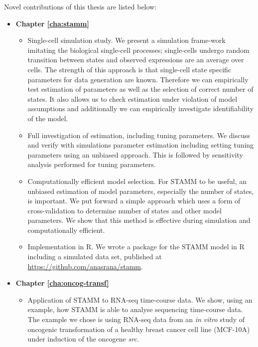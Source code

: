 \vspace*{2cm}
\noindent Novel contributions of this thesis are listed below:
\begin{itemize}
\item {\bf Chapter \ref{cha:stamm}}
\begin{itemize}
\item Single-cell simulation study. We present a simulation frame-work imitating the biological single-cell processes; single-cells undergo random transition between states and observed expressions are an average over cells. The strength of this approach is that single-cell state specific parameters for data generation are known. Therefore we can empirically test estimation of parameters as well as the selection of correct number of states. It also allows us to check estimation under violation of model assumptions and additionally we can empirically investigate identifiability of the model.

\item Full investigation of estimation, including tuning parameters. We discuss and verify with simulations parameter estimation including setting tuning parameters using an unbiased approach. This is followed by sensitivity analysis performed for tuning parameters.

\item Computationally efficient model selection. For STAMM to be useful, an unbiased estimation of model parameters, especially the number of states, is important. We put forward a simple approach which uses a form of cross-validation to determine number of states and other model parameters. We show that this method is effective during simulation and computationally efficient.

\item Implementation in R. We wrote a package for the STAMM model in R including a simulated data set, published at \url{https://github.com/anasrana/stamm}.

\end{itemize}

\item {\bf Chapter \ref{cha:oncog-transf}}

\begin{itemize}
\item Application of STAMM to RNA-seq time-course data.
We show, using an example, how STAMM is able to analyse sequencing time-course data. The example we chose is using RNA-seq data from an {\it in vitro} study of oncogenic transformation of a healthy breast cancer cell line (MCF-10A) under induction of the oncogene {\it src}.


\end{itemize}
\end{itemize}
